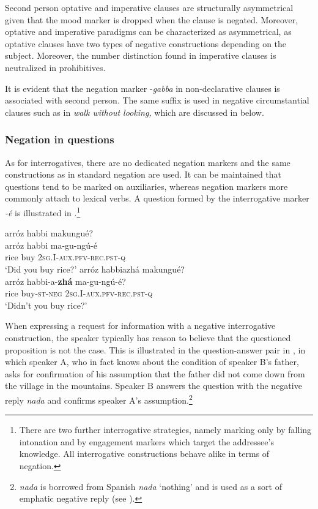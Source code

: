 \documentclass[output=paper,colorlinks,citecolor=brown]{langscibook}
\begin{document}
Second person optative and imperative clauses are structurally asymmetrical given that the mood marker is dropped when the clause is negated. Moreover, optative and imperative paradigms can be characterized as asymmetrical, as optative clauses have two types of negative constructions depending on the subject. Moreover, the number distinction found in imperative clauses is neutralized in prohibitives.

It is evident that the negation marker -\textit{gabba} in non-declarative clauses is associated with second person. The same suffix is used in negative circumstantial clauses such as in \textit{walk without looking,} which are discussed in  below.

 
\subsubsection{Negation in questions}\label{sec:kog:2.2.2}

As for interrogatives, there are no dedicated negation markers and the same constructions as in standard negation are used. It can be maintained that questions tend to be marked on auxiliaries, whereas negation markers more commonly attach to lexical verbs. A question formed by the interrogative marker \textit{{}-é} is illustrated in .\footnote{There are two further interrogative strategies, namely marking only by falling intonation and by engagement markers which target the addressee’s knowledge. All interrogative constructions behave alike in terms of negation.}

\ea\label{ex:kog:31}
    \ea\label{ex:kog:31a}arróz habbi makungué?\\
        \gll  arróz habbi ma-gu-ngú-é\\ 
               rice buy \textsc{2sg.I}{}-\textsc{aux.pfv{}-rec.pst-q}\\
        \glt ‘Did you buy rice?’
    \ex\label{ex:kog:31b}arróz habbiazhá makungué?\\
        \gll  arróz habbi{}-a-\textbf{zhá} ma-gu-ngú-é?\\
              rice buy{}-\textsc{st{}-neg} \textsc{2sg.I}{}-\textsc{aux.pfv{}-rec.pst-q}\\
        \glt ‘Didn't you buy rice?’
    \z
\z 

When expressing a request for information with a negative interrogative construction, the speaker typically has reason to believe that the questioned proposition is not the case. This is illustrated in the question-answer pair in , in which speaker A, who in fact knows about the condition of speaker B’s father, asks for confirmation of his assumption that the father did not come down from the village in the mountains. Speaker B answers the question with the negative reply \textit{nada} and confirms speaker A's assumption.\footnote{\textit{nada} is borrowed from Spanish \textit{nada} ‘nothing’ and is used as a sort of emphatic negative reply (see ).}
\end{document}
